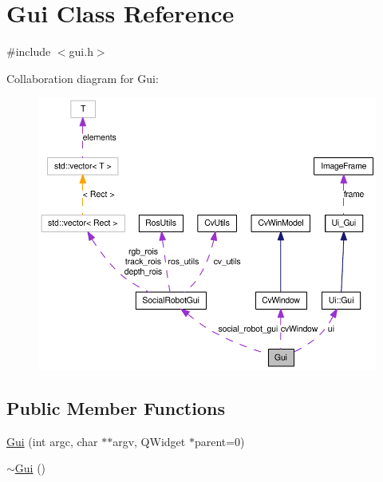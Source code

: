 \hypertarget{classGui}{
\section{Gui Class Reference}
\label{classGui}
}


{\ttfamily \#include $<$gui.h$>$}



Collaboration diagram for Gui:\nopagebreak
\begin{figure}[H]
\begin{center}
\leavevmode
\includegraphics[width=400pt]{classGui__coll__graph}
\end{center}
\end{figure}
\subsection*{Public Member Functions}
\begin{DoxyCompactItemize}
\item 
\hyperlink{classGui_a797b7ddfe4c19abb19a37255de3eaefe}{Gui} (int argc, char $\ast$$\ast$argv, QWidget $\ast$parent=0)
\item 
\hyperlink{classGui_a4fd8485d226f9b8a2ac2d81d7f0f3598}{$\sim$Gui} ()
\end{DoxyCompactItemize}


